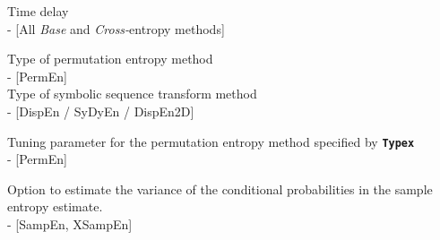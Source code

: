 \documentclass[12pt, a4paper, titlepage, openany]{book}
\begin{document}
\begin{description}[labelsep=1cm, labelwidth=2cm, nosep, style=multiline,leftmargin=3cm]
\item[\texttt{tau}]		Time delay  \\ - [All \textit{Base} and \textit{Cross-}entropy methods]\\
\item[\texttt{Typex}]		Type of permutation entropy method  \\ - [PermEn]\\
Type of symbolic sequence transform method  \\ - [DispEn / SyDyEn / DispEn2D]\\
\item[\texttt{tpx}]		Tuning parameter for the permutation entropy method specified by \texttt{\textbf{Typex}} \\ - [PermEn]\\
\item[\texttt{Vcp}] 	Option to estimate the variance of the conditional probabilities in the sample entropy estimate.\\ - [SampEn, XSampEn]



\end{description}
\end{document}
